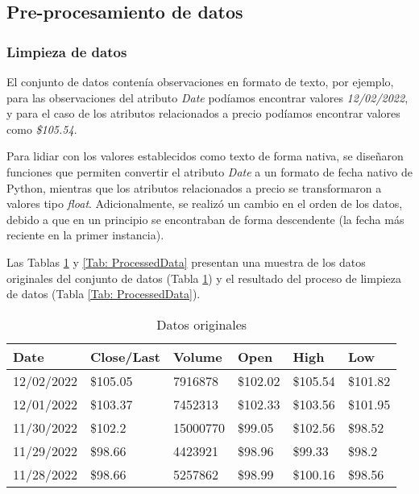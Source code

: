 \subsection{Pre-procesamiento de datos}
\subsubsection{Limpieza de datos}
El conjunto de datos contenía observaciones en formato de texto, por ejemplo, para las observaciones del atributo \emph{Date} podíamos encontrar valores \emph{12/02/2022}, y para el caso de los atributos relacionados a precio podíamos encontrar valores como \emph{\$105.54}.

Para lidiar con los valores establecidos como texto de forma nativa, se diseñaron funciones que permiten convertir el atributo \emph{Date} a un formato de fecha nativo de Python, mientras que los atributos relacionados a precio se transformaron a valores tipo \emph{float}. Adicionalmente, se realizó un cambio en el orden de los datos, debido a que en un principio se encontraban de forma descendente (la fecha más reciente en la primer instancia).

Las Tablas \ref{Tab: InitialData} y \ref{Tab: ProcessedData} presentan una muestra de los datos originales del conjunto de datos (Tabla \ref{Tab: InitialData}) y el resultado del proceso de limpieza de datos (Tabla \ref{Tab: ProcessedData}).

\begin{table}[hp]
\centering
\caption{Datos originales}
\begin{tabular}{@{}llllll@{}}
\toprule
Date       & Close/Last & Volume   & Open     & High     & Low      \\ \midrule
12/02/2022 & \$105.05   & 7916878  & \$102.02 & \$105.54 & \$101.82 \\
12/01/2022 & \$103.37   & 7452313  & \$102.33 & \$103.56 & \$101.95 \\
11/30/2022 & \$102.2    & 15000770 & \$99.05  & \$102.56 & \$98.52  \\
11/29/2022 & \$98.66    & 4423921  & \$98.96  & \$99.33  & \$98.2   \\
11/28/2022 & \$98.66    & 5257862  & \$98.99  & \$100.16 & \$98.56  \\ \bottomrule
\end{tabular}
\label{Tab: InitialData}
\end{table}

